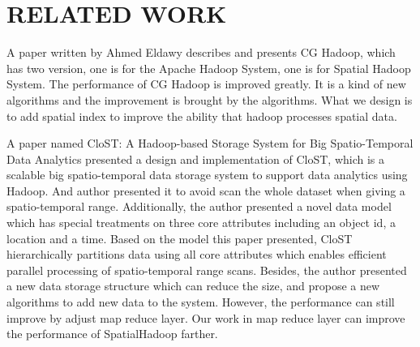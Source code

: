 \section{RELATED WORK}
\label{sect:related}



A paper \cite{eldawy2013cg_hadoop} written by Ahmed Eldawy describes and presents CG Hadoop, which has two version, one is for the Apache Hadoop System, one is for Spatial Hadoop System. The performance of CG Hadoop is improved greatly. It is a kind of new algorithms and the improvement is brought by the algorithms. What we design is to add spatial index to improve the ability that hadoop processes spatial data. 


A paper named CloST: A Hadoop-based Storage System for Big Spatio-Temporal Data Analytics \cite{tan2012clost} presented a design and implementation of CloST, which is a scalable big spatio-temporal data storage system to support data analytics using Hadoop. And author presented it to avoid scan the whole dataset when giving a spatio-temporal range. Additionally, the author presented a novel data model which has special treatments on three core attributes including an object id, a location and a time. Based on the model this paper presented, CloST hierarchically partitions data using all core attributes which enables efficient parallel processing of spatio-temporal range scans. Besides, the author presented a new data storage structure which can reduce the size, and propose a new algorithms to add new data to the system. However, the performance can still improve by adjust map reduce layer. Our work in map reduce layer can improve the performance of SpatialHadoop farther.


